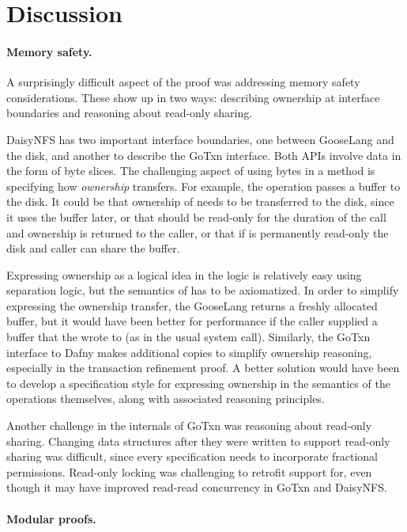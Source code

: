 \section{Discussion}

\paragraph{Memory safety.}
A surprisingly difficult aspect of the proof was addressing memory safety
considerations. These show up in two ways: describing ownership at interface
boundaries and reasoning about read-only sharing.

DaisyNFS has two important interface boundaries, one between GooseLang and the
disk, and another to describe the GoTxn interface. Both APIs involve data in the
form of byte slices. The challenging aspect of using bytes in a method is
specifying how \emph{ownership} transfers. For example, the 
operation passes a buffer  to the disk. It could be that ownership of
 needs to be transferred to the disk, since it uses the buffer later, or
that  should be read-only for the duration of the call and ownership is
returned to the caller, or that if  is permanently read-only the disk and
caller can share the buffer.

Expressing ownership as a logical idea in the logic is relatively easy using
separation logic, but the semantics of  has to be
axiomatized. In order to simplify expressing the ownership transfer, the
GooseLang  returns a freshly allocated buffer, but it would have
been better for performance if the caller supplied a buffer that the
 wrote to (as in the usual  system call). Similarly, the
GoTxn interface to Dafny makes additional copies to simplify ownership
reasoning, especially in the transaction refinement proof. A better solution would
have been to develop a specification style for expressing ownership in the
semantics of the operations themselves, along with associated reasoning
principles.

Another challenge in the internals of GoTxn was reasoning about read-only
sharing. Changing data structures after they were written to support read-only
sharing was difficult, since every specification needs to incorporate fractional
permissions. Read-only locking was challenging to retrofit support for, even
though it may have improved read-read concurrency in GoTxn and DaisyNFS.

\paragraph{Modular proofs.}

